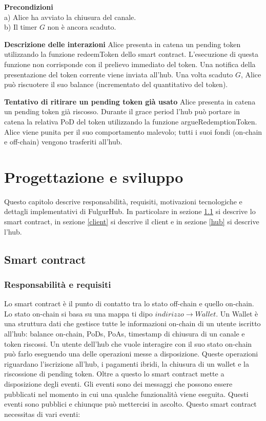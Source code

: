\documentclass[12pt,italian,]{book}
\begin{document}
\textbf{\textbf{Precondizioni}}\\
a) Alice ha avviato la chiusura del canale.\\
b) Il timer \(G\) non è ancora scaduto.

\textbf{\textbf{Descrizione delle interazioni}} Alice presenta in catena un pending token utilizzando la funzione redeemToken dello smart contract. L'esecuzione di questa funzione non corrisponde con il prelievo immediato del token. Una notifica della presentazione del token corrente viene inviata all'hub. Una volta scaduto \(G\), Alice può riscuotere il suo balance (incrementato del quantitativo del token).

\textbf{\textbf{Tentativo di ritirare un pending token già usato}} Alice presenta in catena un pending token già riscosso. Durante il grace period l'hub può portare in catena la relativa PoD del token utilizzando la funzione argueRedemptionToken. Alice viene punita per il suo comportamento malevolo; tutti i suoi fondi (on-chain e off-chain) vengono trasferiti all'hub.

\hypertarget{progettazione-e-sviluppo}{%
\chapter{Progettazione e sviluppo}\label{progettazione-e-sviluppo}}

Questo capitolo descrive responsabilità, requisiti, motivazioni tecnologiche e dettagli implementativi di FulgurHub. In particolare in sezione \ref{smart-contract} si descrive lo smart contract, in sezione \ref{client} si descrive il client e in sezione \ref{hub} si descrive l'hub.

\hypertarget{smart-contract}{%
\section{Smart contract}\label{smart-contract}}

\hypertarget{responsabilituxe0-e-requisiti}{%
\subsection{Responsabilità e requisiti}\label{responsabilituxe0-e-requisiti}}

Lo smart contract è il punto di contatto tra lo stato off-chain e quello on-chain. Lo stato on-chain si basa su una mappa ti dipo \(indirizzo \rightarrow Wallet\). Un Wallet è una struttura dati che gestisce tutte le informazioni on-chain di un utente iscritto all'hub: balance on-chain, PoDs, PoAs, timestamp di chiusura di un canale e token riscossi. Un utente dell'hub che vuole interagire con il suo stato on-chain può farlo eseguendo una delle operazioni messe a disposizione. Queste operazioni riguardano l'iscrizione all'hub, i pagamenti ibridi, la chiusura di un wallet e la riscossione di pending token. Oltre a questo lo smart contract mette a disposizione degli eventi. Gli eventi sono dei messaggi che possono essere pubblicati nel momento in cui una qualche funzionalità viene eseguita. Questi eventi sono pubblici e chiunque può mettercisi in ascolto. Questo smart contract necessitas di vari eventi:
\end{document}
